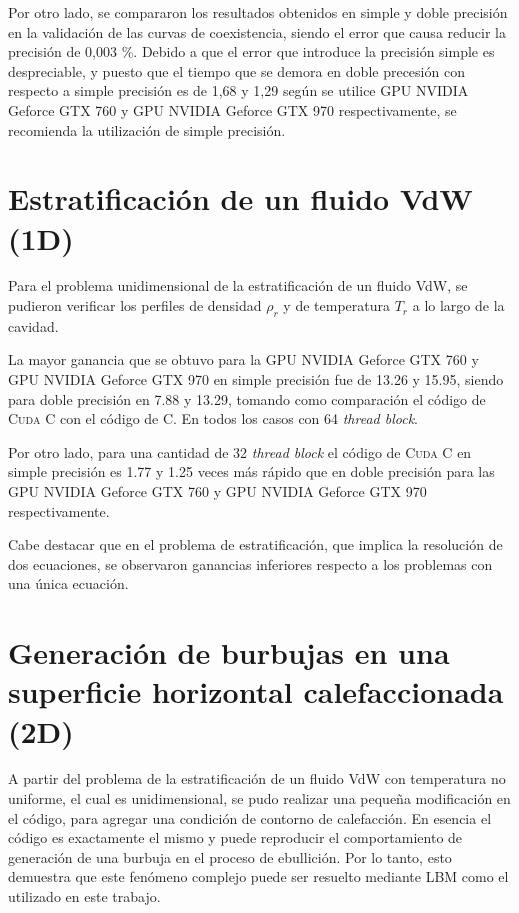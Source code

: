 Por otro lado, se compararon los resultados obtenidos en simple y doble precisión en la validación de las curvas de coexistencia, siendo el error que causa reducir la precisión de 0,003 \%.  Debido a que el error que introduce la precisión simple es despreciable, y puesto que el tiempo que se demora en doble precesión con respecto a simple precisión es de 1,68 y 1,29 según se utilice GPU NVIDIA Geforce GTX 760 y GPU NVIDIA Geforce GTX 970 respectivamente, se recomienda la utilización de simple precisión.

\section{Estratificación de un fluido VdW (1D)}

Para el problema unidimensional de la estratificación de un fluido VdW, se pudieron verificar los perfiles de densidad $\rho_r$ y de temperatura $T_r$ a lo largo de la cavidad. 

La mayor ganancia que se obtuvo para la GPU NVIDIA Geforce GTX 760 y GPU NVIDIA Geforce GTX 970 en simple precisión fue de 13.26 y 15.95, siendo para doble precisión en 7.88 y 13.29, tomando como comparación el código de \textsc{Cuda C} con el código de \textsc{C}. En todos los casos con 64 \textit{thread block}.

Por otro lado, para una cantidad de 32 \textit{thread block} el código de \textsc{Cuda C}  en simple precisión es 1.77 y 1.25 veces más rápido que en doble precisión para  las GPU NVIDIA Geforce GTX 760 y GPU NVIDIA Geforce GTX 970 respectivamente. 

Cabe destacar que en el problema de estratificación, que implica la resolución de dos ecuaciones, se observaron ganancias inferiores respecto a los problemas con una única ecuación.

\section{Generación de burbujas en una superficie horizontal calefaccionada (2D)}

A partir del problema de la estratificación de un fluido VdW con temperatura no uniforme, el cual es unidimensional, se pudo realizar una pequeña modificación en el código, para agregar una condición de contorno de calefacción. En esencia el código es exactamente el mismo y puede reproducir el comportamiento de generación de una burbuja en el proceso de ebullición. Por lo tanto, esto demuestra que este fenómeno complejo puede ser resuelto mediante LBM como el utilizado en este trabajo.

